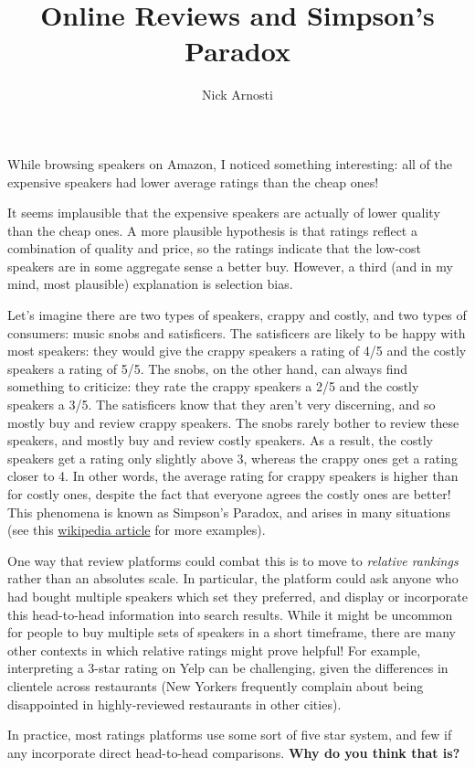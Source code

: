 \documentclass[11pt, oneside]{article}   	%
\title{Online Reviews and Simpson's Paradox}
\author{Nick Arnosti}
\begin{document}
\maketitle

While browsing speakers on Amazon, I noticed something interesting: all of the expensive speakers had lower average ratings than the cheap ones!

It seems implausible that the expensive speakers are actually of lower quality than the cheap ones. A more plausible hypothesis is that ratings reflect a combination of quality and price, so the ratings indicate that the low-cost speakers are in some aggregate sense a better buy. However, a third (and in my mind, most plausible) explanation is selection bias.

Let's imagine there are two types of speakers, crappy and costly, and two types of consumers: music snobs and satisficers. The satisficers are likely to be happy with most speakers: they would give the crappy speakers a rating of 4/5 and the costly speakers a rating of 5/5. The snobs, on the other hand, can always find something to criticize: they rate the crappy speakers a 2/5 and the costly speakers a 3/5. The satisficers know that they aren't very discerning, and so mostly buy and review crappy speakers. The snobs rarely bother to review these speakers, and mostly buy and review costly speakers. As a result, the costly speakers get a rating only slightly above 3, whereas the crappy ones get a rating closer to 4. In other words, the average rating for crappy speakers is higher than for costly ones, despite the fact that everyone agrees the costly ones are better! This phenomena is known as Simpson's Paradox, and arises in many situations (see this {\color{blue} \href{https://en.wikipedia.org/wiki/Simpson\%27s_paradox}{wikipedia article}} for more examples). 

One way that review platforms could combat this is to move to {\em relative rankings} rather than an absolutes scale. In particular, the platform could ask anyone who had bought multiple speakers which set they preferred, and display or incorporate this head-to-head information into search results. While it might be uncommon for people to buy multiple sets of speakers in a short timeframe, there are many other contexts in which relative ratings might prove helpful! For example, interpreting a 3-star rating on Yelp can be challenging, given the differences in clientele across restaurants (New Yorkers frequently complain about being disappointed in highly-reviewed restaurants in other cities). 

In practice, most ratings platforms use some sort of five star system, and few if any incorporate direct head-to-head comparisons. {\bf Why do you think that is?}
\end{document}
